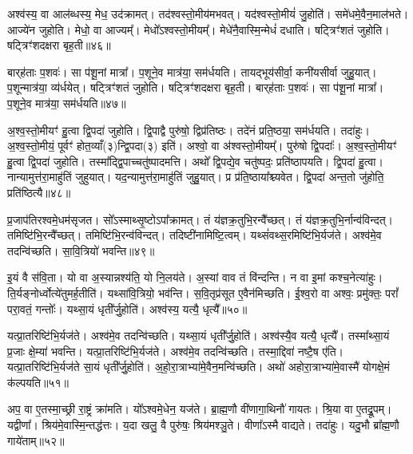 अश्व॑स्य॒ वा आल॑ब्धस्य॒ मेध॒ उद॑क्रामत्।
तद॑श्वस्तो॒मीय॑\-मभवत्।
यद॑श्वस्तो॒मीयं॑ जु॒होति॑।
समे॑धमे॒वैन॒माल॑भते।
आज्ये॑न जुहोति।
मेधो॒ वा आज्यम्᳚।
मेधो᳚\-ऽश्वस्तो॒मीयम्᳚।
मेधे॑नै॒वास्मि॒न्मेधं॑ दधाति।
षट्त्रिꣳ॑शतं जुहोति।
षट्त्रिꣳ॑शदक्षरा बृह॒ती॥४६॥\ip

बार्‌\mbox{}ह॑ताः प॒शवः॑।
सा प॑शू॒नां मात्रा᳚।
प॒शूने॒व मात्र॑या॒ सम॑र्धयति।
तायद्भूय॑सीर्वा॒ कनी॑यसीर्वा जुहु॒यात्।
प॒शून्मात्र॑या॒ व्य॑र्धयेत्।
षट्त्रिꣳ॑शतं जुहोति।
षट्त्रिꣳ॑शदक्षरा बृह॒ती।
बार्‌\mbox{}ह॑ताः प॒शवः॑।
सा प॑शू॒नां मात्रा᳚।
प॒शूने॒व मात्र॑या॒ सम॑र्धयति॥४७॥\ip

अ॒श्व॒स्तो॒मीयꣳ॑ हु॒त्वा द्वि॒पदा॑ जुहोति।
द्वि॒पाद्वै पुरु॑षो॒ द्विप्र॑तिष्ठः।
तदे॑नं प्रति॒ष्ठया॒ सम॑र्धयति।
तदा॑हुः।
अ॒श्व॒स्तो॒मीयं॒ पूर्वꣳ॑ होत॒व्याँ(३)न्द्वि॒पदा(३) इति॑।
अश्वो॒ वा अ॑श्वस्तो॒मीयम्᳚।
पुरु॑षो द्वि॒पदाः᳚।
अ॒श्व॒स्तो॒मीयꣳ॑ हु॒त्वा द्वि॒पदा॑ जुहोति।
तस्मा᳚द्\-द्वि॒पाच्चतु॑ष्पादमत्ति।
अथो᳚ द्वि॒पद्ये॒व चतु॑ष्पदः॒ प्रति॑\-ष्ठापयति।
द्वि॒पदा॑ हु॒त्वा।
नान्यामुत्त॑रा॒माहु॑तिं जुहुयात्।
यद॒न्यामुत्त॑रा॒माहु॑तिं जुहु॒यात्।
प्र प्र॑ति॒ष्ठाया᳚श्च्यवेत।
द्वि॒पदा॑ अन्त॒तो जु॑होति॒ प्रति॑\-ष्ठित्यै॥४८॥\ip{}

प्र॒जा\-प॑तिरश्वमे॒धम॑\-सृजत।
सो᳚ऽस्माथ्सृ॒ष्टो\-ऽपा᳚क्रामत्।
तं य॑ज्ञ\-क्र॒तुभि॒रन्वै᳚च्छत्।
तं य॑ज्ञ\-क्र॒तुभि॒र्नान्व॑विन्दत्।
तमिष्टि॑भि॒रन्वै᳚च्छत्।
तमिष्टि॑भि॒रन्व॑विन्दत्।
तदिष्टी॑नामिष्टि॒\-त्वम्।
यथ्सं॑वथ्स॒रमिष्टि॑\-भि॒र्यज॑ते।
अश्व॑मे॒व तदन्वि॑च्छति।
सा॒वि॒त्रियो॑ भवन्ति॥४९॥\ip

इ॒यं वै स॑वि॒ता।
यो वा अ॒स्यान्नश्य॑ति॒ यो नि॒लय॑ते।
अ॒स्यां वाव तं वि॑न्दन्ति।
न वा इ॒मां कश्च॒नेत्या॑हुः।
ति॒र्यङ्नोर्ध्वोत्ये॑तुमर्ह॒तीति॑।
यथ्सा॑वि॒त्रियो॒ भव॑न्ति।
स॒वि॒तृ\-प्र॑सूत ए॒वैन॑मिच्छति।
ई॒श्व॒रो वा अश्वः॒ प्रमु॑क्तः॒ परां᳚ परा॒वतं॒ गन्तोः᳚।
यथ्सा॒यं धृती᳚र्जु॒होति॑।
अश्व॑स्य॒ यत्यै॒ धृत्यै᳚॥५०॥\ip

यत्प्रा॒तरिष्टि॑भि॒र्यज॑ते।
अश्व॑मे॒व तदन्वि॑च्छति।
यथ्सा॒यं धृती᳚र्जु॒होति॑।
अश्व॑स्यै॒व यत्यै॒ धृत्यै᳚।
तस्मा᳚थ्सा॒यं प्र॒जाः क्षे॒म्या॑ भवन्ति।
यत्प्रा॒तरिष्टि॑भि॒र्यज॑ते।
अश्व॑मे॒व तदन्वि॑च्छति।
तस्मा॒द्दिवा॑ नष्टै॒ष ए॑ति।
यत्प्रा॒तरिष्टि॑भि॒र्यज॑ते सा॒यं धृती᳚र्जु॒होति॑।
अ॒हो॒रा॒त्राभ्या॑मे॒वैन॒मन्वि॑च्छति।
अथो॑ अहोरा॒त्राभ्या॑मे॒वास्मै॑ योग\-क्षे॒मं क॑ल्पयति॥५१॥\ip\anuvakamend[भ॒व॒न्ति॒ धृत्या॑ एन॒मन्वि॑च्छ॒त्येकं॑ च]

अप॒ वा ए॒तस्मा॒च्छ्री रा॒ष्ट्रं क्रा॑मति।
यो᳚ऽश्वमे॒धेन॒ यज॑ते।
ब्रा॒ह्म॒णौ वी॑णागा॒थिनौ॑ गायतः।
श्रि॒या वा ए॒तद्रू॒पम्।
यद्वीणा᳚।
श्रिय॑मे॒वास्मि॒न्तद्ध॑त्तः।
य॒दा खलु॒ वै पुरु॑षः॒ श्रिय॑मश्ञु॒ते।
वीणा᳚\-ऽस्मै वाद्यते।
तदा॑हुः।
यदु॒भौ ब्रा᳚ह्म॒णौ गाये॑ताम्॥५२॥\ip

